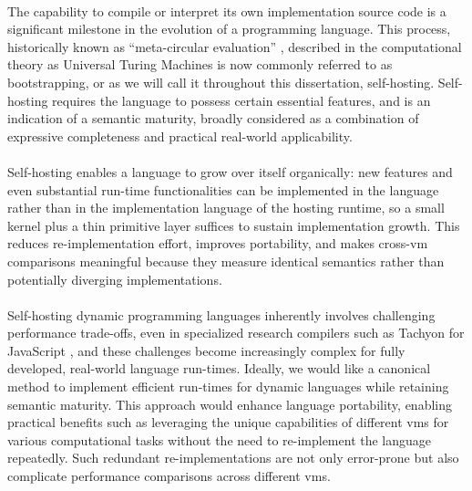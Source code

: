         \paragraph{}%
            The capability to compile or interpret its own implementation source code is a significant milestone in the evolution of a programming language. This process, historically known as “meta-circular evaluation” \cite{sicpbook}, described in the computational theory as Universal Turing Machines is now commonly referred to as bootstrapping, or as we will call it throughout this dissertation, self-hosting. Self-hosting requires the language to possess certain essential features, and is an indication of a semantic maturity, broadly considered as a combination of expressive completeness and practical real-world applicability.

        \paragraph{}%
            Self-hosting enables a language to grow over itself organically: new features and even substantial run-time functionalities can be implemented in the language rather than in the implementation language of the hosting runtime, so a small kernel plus a thin primitive layer suffices to sustain implementation growth. This reduces re-implementation effort, improves portability, and makes cross-\gls{vm} comparisons meaningful because they measure identical semantics rather than potentially diverging implementations.

        \paragraph{}%
            Self-hosting dynamic programming languages inherently involves challenging performance trade-offs, even in specialized research compilers such as Tachyon for JavaScript \cite{self-hosted-tachyon}, and these challenges become increasingly complex for fully developed, real-world language run-times. Ideally, we would like a canonical method to implement efficient run-times for dynamic languages while retaining semantic maturity. This approach would enhance language portability, enabling practical benefits such as leveraging the unique capabilities of different \glspl{vm} for various computational tasks without the need to re-implement the language repeatedly. Such redundant re-implementations are not only error-prone but also complicate performance comparisons across different \glspl{vm}.

